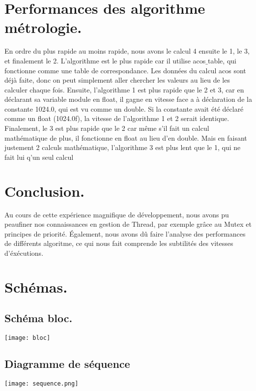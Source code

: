 \documentclass[12pt]{article}
\begin{document}
\section{Performances des algorithme métrologie.}
En ordre du plus rapide au moins rapide, nous avons le calcul 4 ensuite le 1, le 3, et finalement le 2. L'algorithme  est le plus rapide car il utilise acos$\_$table, qui fonctionne comme une table de correspondance. Les données du calcul acos sont déjà faite, donc on peut simplement aller chercher les valeurs au lieu de les calculer chaque fois. Ensuite, l'algorithme 1 est plus rapide que le 2 et 3, car en déclarant sa variable module en float, il gagne en vitesse face a à déclaration de la constante 1024.0, qui est vu comme un double. Si la constante avait été déclaré comme un float (1024.0f), la vitesse de l'algorithme 1 et 2 serait identique. Finalement, le 3 est plus rapide que le 2 car même s'il fait un calcul mathématique de plus, il fonctionne en float au lieu d'en double. Mais en faisant justement 2 calculs mathématique, l'algorithme 3 est plus lent que le 1, qui ne fait lui q'un seul calcul
\section{Conclusion.}
Au cours de cette expérience magnifique de développement, nous avons pu peaufiner nos connaissances en gestion de Thread, par exemple grâce au Mutex et principes de priorité. Également, nous avons dû faire l'analyse des performances de différents algoritme, ce qui nous fait comprende les subtilités des vitesses d'éxécutions. 
\section{Schémas.}
\subsection{Schéma bloc.}
\texttt{[image: bloc]}
\subsection{Diagramme de séquence}
\texttt{[image: sequence.png]}
\end{document}
